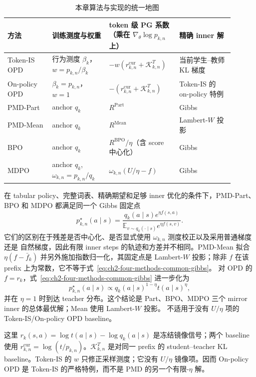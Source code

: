 \documentclass[lang=cn,scheme=chinese,openany]{../book/elegantbook}
\begin{document}
\begin{table}[ht]
\centering
\caption{本章算法与实现的统一地图}
\label{tab:ch2-opd-baseline-map}
\begin{tabular}{p{0.18\linewidth}p{0.23\linewidth}p{0.27\linewidth}p{0.22\linewidth}}
\toprule
方法 & 训练测度与权重 & token 级 PG 系数（乘在 $\nabla_\theta\log p_{k,n}$ 上） & 精确 inner 解 \\
\midrule
Token-IS OPD & 行为测度 $\beta_k$，$w= p_{k,n}/\beta_k$ & $-w(r_{k,n}^{\mathrm{cur}}+\mathcal K_{k,n}^{T})$ & 当前学生--教师 KL 梯度 \\
On-policy OPD & $\beta_k= p_{k,n}$，$w=1$ & $-(r_{k,n}^{\mathrm{cur}}+\mathcal K_{k,n}^{T})$ & Token-IS 的 on-policy 特例 \\
PMD-Part & anchor $ q_k$ & $R^{\mathrm{Part}}$ & Gibbs \\
PMD-Mean & anchor $ q_k$ & $R^{\mathrm{Mean}}$ & Lambert-$W$ 投影 \\
BPO & anchor $ q_k$ & $R^{\mathrm{BPO}}/\eta$（含 score 中心化） & Gibbs \\
MDPO & anchor $ q_k$,$\omega_{k,n}= p_{k,n}/ q_k$ & $\omega_{k,n}(U/\eta-f)$ & Gibbs \\
\bottomrule
\end{tabular}
\end{table}

在 tabular policy、完整词表、精确期望和足够 inner 优化的条件下，PMD-Part、BPO
和 MDPO 都满足同一个 Gibbs 固定点
\begin{equation}
\label{eq:ch2-four-methods-common-gibbs}
 p_{k,n}^{\star}(a\mid s)
=\frac{ q_k(a\mid s)e^{\eta f(s,a)}}{\mathbb E_{v\sim q_k(\cdot\mid s)}e^{\eta f(s,v)}}.
\end{equation}
它们的区别在于残差是否中心化、是否显式使用 $\omega_{k,n}$ 测度校正以及采用普通梯度还是
自然梯度，因此有限 inner steps 的轨迹和方差并不相同。PMD-Mean 拟合
$\eta(f-\bar f_k)$ 并另外施加指数归一化，其固定点是 Lambert-$W$ 投影；除非
$f$ 在该 prefix 上为常数，它不等于式~\eqref{eq:ch2-four-methods-common-gibbs}。
对 OPD 的 $f=r_k$，式~\eqref{eq:ch2-four-methods-common-gibbs} 进一步化为
\begin{equation}
 p_{k,n}^{\star}(a\mid s)
\propto  q_k(a\mid s)^{1-\eta} t(a\mid s)^{\eta},
\end{equation}
并在 $\eta=1$ 时到达 teacher 分布。这个结论是 Part、BPO、MDPO 三个 mirror inner 的总体最优解；Mean 使用 Lambert-$W$ 投影。
不适用于没有 $U/\eta$ 项的 Token-IS/On-policy OPD baseline。

这里 $r_k(s,a)=\log t(a\mid s)-\log q_k(a\mid s)$ 是冻结镜像信号；两个 baseline 使用 $r_{k,n}^{\mathrm{cur}}=\log(t/p_{k,n})$。$\mathcal K_{k,n}^{T}$ 是对同一 prefix 的 student--teacher KL baseline。Token-IS
的 $w$ 只修正采样测度；它没有 $U/\eta$ 镜像项。因而 On-policy OPD 是 Token-IS
的严格特例，而不是 PMD 的另一个有限-$\eta$ 解。
\end{document}
